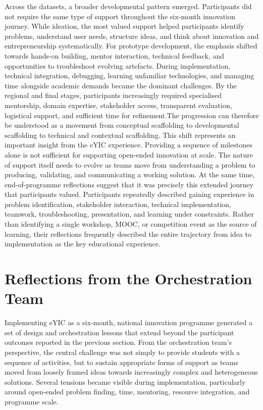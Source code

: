 \documentclass[runningheads]{llncs}
\begin{document}
Across the datasets, a broader developmental pattern emerged. Participants did not require the same type of support throughout the six-month innovation journey. While ideation, the most valued support helped participants identify problems, understand user needs, structure ideas, and think about innovation and entrepreneurship systematically. For prototype development, the emphasis shifted towards hands-on building, mentor interaction, technical feedback, and opportunities to troubleshoot evolving artefacts. During implementation, technical integration, debugging, learning unfamiliar technologies, and managing time alongside academic demands became the dominant challenges. By the regional and final stages, participants increasingly required specialised mentorship, domain expertise, stakeholder access, transparent evaluation, logistical support, and sufficient time for refinement.The progression can therefore be understood as a movement from conceptual scaffolding to developmental scaffolding to technical and contextual scaffolding. This shift represents an important insight from the eYIC experience. Providing a sequence of milestones alone is not sufficient for supporting open-ended innovation at scale. The nature of support itself needs to evolve as teams move from understanding a problem to producing, validating, and communicating a working solution. At the same time, end-of-programme reflections suggest that it was precisely this extended journey that participants valued. Participants repeatedly described gaining experience in problem identification, stakeholder interaction, technical implementation, teamwork, troubleshooting, presentation, and learning under constraints. Rather than identifying a single workshop, MOOC, or competition event as the source of learning, their reflections frequently described the entire trajectory from idea to implementation as the key educational experience.

\section{Reflections from the Orchestration Team}

Implementing eYIC as a six-month, national innovation programme generated a set of design and orchestration lessons that extend beyond the participant outcomes reported in the previous section. From the orchestration team’s perspective, the central challenge was not simply to provide students with a sequence of activities, but to sustain appropriate forms of support as teams moved from loosely framed ideas towards increasingly complex and heterogeneous solutions. Several tensions became visible during implementation, particularly around open-ended problem finding, time, mentoring, resource integration, and programme scale.
\end{document}
